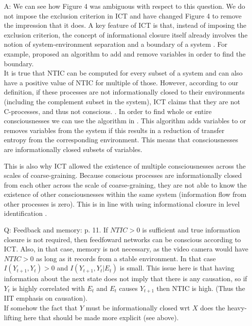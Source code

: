 \documentclass[utf8]{article}
\newcounter{cQuestion}[section]
\newenvironment{question}
    {\refstepcounter{cQuestion}\color{Blue}\noindent\newline Q\thecQuestion:}
    {~\newline}
\newenvironment{ans}  
    {\color{Black}\noindent A:}
    {~\newline}
\begin{document}
    	\begin{ans}
            We can see how Figure 4 was ambiguous with respect to this question. We do not impose the exclusion criterion in ICT and have changed Figure 4 to remove the impression that it does. 
            A key feature of ICT is that, instead of imposing the exclusion criterion, the concept of informational closure itself already involves the notion of system-environment separation and a boundary of a system \citep{BERTSCHINGER.2006}. For example, \citet{krakauer2014information,krakauer2020information} proposed an algorithm to add and remove variables in order to find the boundary. \\
            It is true that NTIC can be computed for every subset of a system and can also have a positive value of NTIC for multiple of those. However, according to our definition, if these processes are not informationally closed to their environments (including the complement subset in the system), ICT claims that they are not C-processes, and thus not conscious. . In order to find whole or entire consciousnesses we can use the algorithm in \citet{krakauer2014information, krakauer2020information}. This algorithm adds variables to or removes variables from the system if this results in a reduction of transfer entropy from the corresponding environment. This means that consciousnesses are informationally closed subsets of variables. 
            
            This is also why ICT allowed the existence of multiple consciousnesses across the scales of coarse-graining. Because conscious processes are informationally closed from each other across the scale of coarse-graining, they are not able to know the existence of other consciousnesses within the same system (information flow from other processes is zero). This is in line with using informational closure in level identification \citep{PFANTE.2014}.
    	\end{ans}

        \begin{question}
            Feedback and memory: p. 11. If $NTIC > 0$ is sufficient and true information closure is not required, then feedfoward networks can be conscious according to ICT. Also, in that case, memory is not necessary, as the video camera would have $NTIC > 0$ as long as it records from a stable environment. In that case $I(Y_{t+1}, Y_t) > 0$ and $I(Y_{t+1}, Y_t|E_t)$ is small. This issue here is that having information about the next state does not imply that there is any causation, so if $Y_t$ is highly correlated with $E_t$ and $E_t$ causes $Y_{t+1}$ then NTIC is high. (Thus the IIT emphasis on causation).\\
            If somehow the fact that $Y$ must be informationally closed wrt $X$ does the heavy-lifting here that should be made more explicit (see above).
        \end{question}
        
\end{document}

